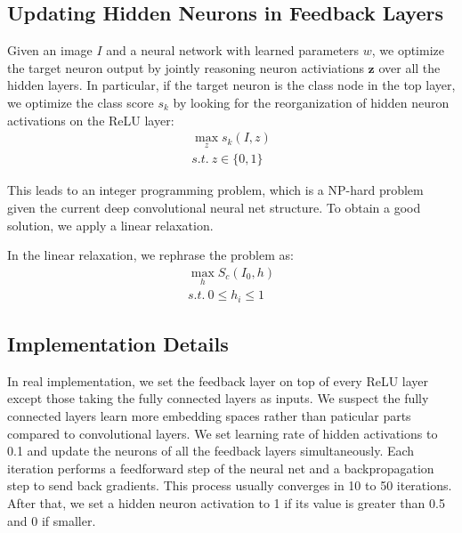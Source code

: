 \subsection{Updating Hidden Neurons in Feedback Layers}
Given an image $I$ and a neural network with learned parameters $w$, we optimize the target neuron output by jointly reasoning neuron activiations $\mathbf{z}$ over all the hidden layers. In particular, if the target neuron is the class node in the top layer, we optimize the class score $s_k$ by looking for the reorganization of hidden neuron activations on the ReLU layer:
\begin{equation}
\begin{aligned}
  \max_z s_k(I, z) \\
  s.t.\ z \in \{0, 1\}
\end{aligned}
\end{equation}

This leads to an integer programming problem, which is a NP-hard problem given the current deep convolutional neural net structure. To obtain a good solution, we apply a linear relaxation.

In the linear relaxation, we rephrase the problem as:
\begin{equation}
\begin{aligned}
  \max_h S_c(I_0, h) \\
  s.t.\ 0 \leq h_i \leq 1
\end{aligned}
\end{equation}

\subsection{Implementation Details}
In real implementation, we set the feedback layer on top of every ReLU layer except those taking the fully connected layers as inputs. We suspect the fully connected layers learn more embedding spaces rather than paticular parts compared to convolutional layers. We set learning rate of hidden activations to 0.1 and update the neurons of all the feedback layers simultaneously. Each iteration performs a feedforward step of the neural net and a backpropagation step to send back gradients. This process usually converges in 10 to 50 iterations. After that, we set a hidden neuron activation to 1 if its value is greater than 0.5 and 0 if smaller. 
